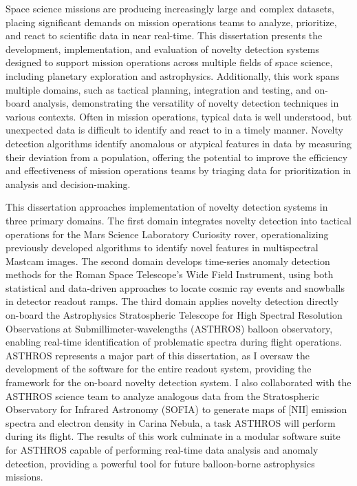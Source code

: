 Space science missions are producing increasingly large and complex datasets, placing significant demands on mission operations teams to analyze, prioritize, and react to scientific data in near real-time.
This dissertation presents the development, implementation, and evaluation of novelty detection systems designed to support mission operations across multiple fields of space science, including planetary exploration and astrophysics.
Additionally, this work spans multiple domains, such as tactical planning, integration and testing, and on-board analysis, demonstrating the versatility of novelty detection techniques in various contexts.
Often in mission operations, typical data is well understood, but unexpected data is difficult to identify and react to in a timely manner.
Novelty detection algorithms identify anomalous or atypical features in data by measuring their deviation from a population, offering the potential to improve the efficiency and effectiveness of mission operations teams by triaging data for prioritization in analysis and decision-making.

This dissertation approaches implementation of novelty detection systems in three primary domains.
The first domain integrates novelty detection into tactical operations for the Mars Science Laboratory Curiosity rover, operationalizing previously developed algorithms to identify novel features in multispectral Mastcam images.
The second domain develops time-series anomaly detection methods for the Roman Space Telescope's Wide Field Instrument, using both statistical and data-driven approaches to locate cosmic ray events and snowballs in detector readout ramps.
The third domain applies novelty detection directly on-board the Astrophysics Stratospheric Telescope for High Spectral Resolution Observations at Submillimeter-wavelengths (ASTHROS) balloon observatory, enabling real-time identification of problematic spectra during flight operations.
ASTHROS represents a major part of this dissertation, as I oversaw the development of the software for the entire readout system, providing the framework for the on-board novelty detection system.
I also collaborated with the ASTHROS science team to analyze analogous data from the Stratospheric Observatory for Infrared Astronomy (SOFIA) to generate maps of [NII] emission spectra and electron density in Carina Nebula, a task ASTHROS will perform during its flight.
The results of this work culminate in a modular software suite for ASTHROS capable of performing real-time data analysis and anomaly detection, providing a powerful tool for future balloon-borne astrophysics missions.